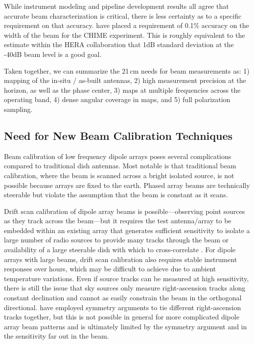 \documentclass[preprint2,numberedappendix,tighten,twocolappendix]{aastex6}
\begin{document}
While instrument modeling and pipeline development results all agree that accurate beam characterization is critical, there is less certainty as to a specific requirement on that accuracy.  \citet{Shaw2015_chimemmodes} have placed a requirement of 0.1\% accuracy on the width of the beam for the CHIME experiment. This is roughly equivalent to the estimate within the HERA collaboration that 1dB standard deviation at the -40dB beam level is a good goal.

Taken together, we can summarize the 21\,cm needs for beam measurements as: 1) mapping of the in-situ / as-built antennas, 2) high measurement precision at the horizon, as well as the phase center, 3) maps at multiple frequencies across the operating band, 4) dense angular coverage in maps, and 5) full polarization sampling.

\subsection{Need for New Beam Calibration Techniques}

Beam calibration of low frequency dipole arrays poses several complications compared to traditional dish antennas. Most notable is that traditional beam calibration, where the beam is scanned across a bright isolated source, is not possible because arrays are fixed to the earth. Phased array beams are technically steerable but violate the assumption that the beam is constant as it scans. 

Drift scan calibration of dipole array beams is possible---observing point sources as they track across the beam---but it requires the test antenna/array to be embedded within an existing array that generates sufficient sensitivity to isolate a large number of radio sources to provide many tracks through the beam or availability of a large steerable dish with which to cross-correlate \citet{Berger:CHIME_beam_map2016-arxiv}.  For dipole arrays with large beams, drift scan calibration also requires stable instrument responses over hours, which may be difficult to achieve due to ambient temperature variations.  Even if source tracks can be measured at high sensitivity, there is still the issue that sky sources only measure right-ascension tracks along constant declination and cannot as easily constrain the beam in the orthogonal directional. \citet{Pober:2013p9942} have employed symmetry arguments to tie  different right-ascension tracks together, but this is not possible in general for more complicated dipole array beam patterns and is ultimately limited by the symmetry argument and in the sensitivity far out in the beam.   
\end{document}
